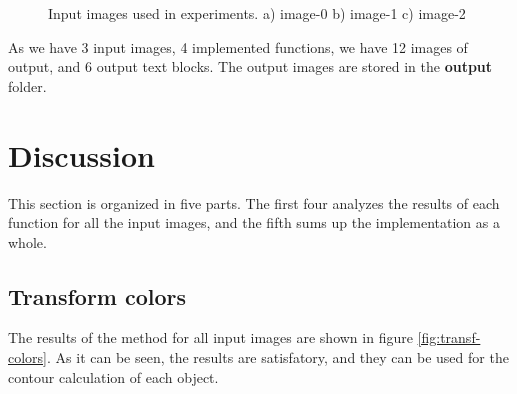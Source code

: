 \documentclass[]{IEEEtran}
\begin{document}
\begin{figure}[]
  \centering
  \caption{Input images used in experiments. a) image-0 b) image-1 c) image-2}
  \label{fig:input-images}
\end{figure}

As we have 3 input images, 4 implemented functions, we have 12 images of output, and 6 output text blocks. The output images are stored in the \textbf{output} folder.

\section{Discussion}
This section is organized in five parts. The first four analyzes the results of each function for all the input images, and the fifth sums up the implementation as a whole.

\subsection{Transform colors}
The results of the method for all input images are shown in figure \ref{fig:transf-colors}. As it can be seen, the results are satisfatory, and they can be used for the contour calculation of each object.
\end{document}
